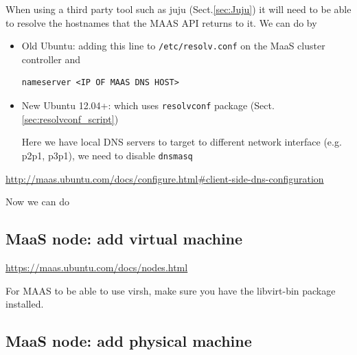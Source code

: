 When using a third party tool such as juju (Sect.\ref{sec:Juju}) it will need to
be able to resolve the hostnames that the MAAS API returns to it. We can do by
\begin{itemize}
  \item Old Ubuntu:
  adding this line to \verb!/etc/resolv.conf! on the MaaS cluster controller and
\begin{verbatim}
nameserver <IP OF MAAS DNS HOST>
\end{verbatim}
  
   \item New Ubuntu 12.04+: which uses \verb!resolvconf! package
   (Sect.\ref{sec:resolvconf_script})
   
   Here we have local DNS servers to target to different network interface
   (e.g. p2p1, p3p1), we need to disable \verb!dnsmasq!
   
\end{itemize} 
\url{http://maas.ubuntu.com/docs/configure.html#client-side-dns-configuration}

Now we can do

\subsection{MaaS node: add virtual machine}
\label{sec:MaaS_node_virtual}

\url{https://maas.ubuntu.com/docs/nodes.html}


For MAAS to be able to use virsh, make sure you have the libvirt-bin package
installed.


\subsection{MaaS node: add physical machine}
\label{sec:MaaS_node_install}

